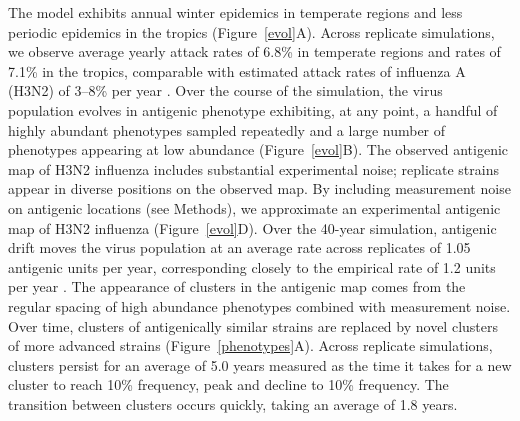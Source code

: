 \documentclass[11pt,oneside,letterpaper]{article}
\begin{document}
The model exhibits annual winter epidemics in temperate regions and less periodic epidemics in the tropics (Figure~\ref{evol}A).  Across replicate simulations, we observe average yearly attack rates of 6.8\% in temperate regions and rates of 7.1\% in the tropics, comparable with estimated attack rates of influenza A (H3N2) of 3--8\% per year \cite{Monto93,Koelle09}.  Over the course of the simulation, the virus population evolves in antigenic phenotype exhibiting, at any point, a handful of highly abundant phenotypes sampled repeatedly and a large number of phenotypes appearing at low abundance (Figure~\ref{evol}B).  The observed antigenic map of H3N2 influenza includes substantial experimental noise; replicate strains appear in diverse positions on the observed map.  By including measurement noise on antigenic locations (see Methods), we approximate an experimental antigenic map of H3N2 influenza (Figure~\ref{evol}D).  Over the 40-year simulation, antigenic drift moves the virus population at an average rate across replicates of 1.05 antigenic units per year, corresponding closely to the empirical rate of 1.2 units per year \cite{Smith04}. The appearance of clusters in the antigenic map comes from the regular spacing of high abundance phenotypes combined with measurement noise.  Over time, clusters of antigenically similar strains are replaced by novel clusters of more advanced strains (Figure~\ref{phenotypes}A).  Across replicate simulations, clusters persist for an average of 5.0 years measured as the time it takes for a new cluster to reach 10\% frequency, peak and decline to 10\% frequency.  The transition between clusters occurs quickly, taking an average of 1.8 years.
\end{document}
